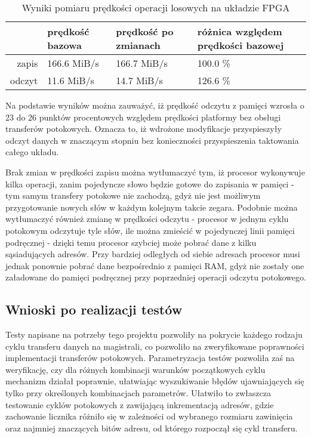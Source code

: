 \begin{table}[H]
\begin{center}
\begin{tabular}{ r|l|l|l| }
  & prędkość bazowa & prędkość po zmianach & różnica względem prędkości bazowej\\
 \hline
 zapis & 166.6 MiB/s & 166.7 MiB/s & 100.0 \%\\
 odczyt & 11.6 MiB/s & 14.7 MiB/s & 126.6 \%\\
 \hline
\end{tabular}
\end{center}
\caption{\label{tab:benchmark-rnd-arty}Wyniki pomiaru prędkości operacji losowych na układzie FPGA}
\end{table}

Na podstawie wyników można zauważyć, iż prędkość odczytu z pamięci wzrosła o 23 do 26 punktów procentowych względem prędkości platformy bez obsługi transferów potokowych. Oznacza to, iż wdrożone modyfikacje przyspieszyły odczyt danych w znaczącym stopniu bez konieczności przyspieszenia taktowania całego układu.

Brak zmian w prędkości zapisu można wytłumaczyć tym, iż procesor wykonywuje kilka operacji, zanim pojedyncze słowo będzie gotowe do zapisania w pamięci - tym samym transfery potokowe nie zachodzą, gdyż nie jest możliwym przygotowanie nowych słów w każdym kolejnym takcie zegara.
Podobnie można wytłumaczyć również zmianę w prędkości odczytu - procesor w jednym cyklu potokowym odczytuje tyle słów, ile można zmieścić w pojedynczej linii pamięci podręcznej - dzięki temu procesor szybciej może pobrać dane z kilku sąsiadujących adresów. Przy bardziej odległych od siebie adresach procesor musi jednak ponownie pobrać dane bezpośrednio z pamięci RAM, gdyż nie zostały one załadowane do pamięci podręcznej przy poprzedniej operacji odczytu potokowego.


\subsection{Wnioski po realizacji testów}

Testy napisane na potrzeby tego projektu pozwoliły na pokrycie każdego rodzaju cyklu transferu danych na magistrali, co pozwoliło na zweryfikowane poprawności implementacji transferów potokowych. Parametryzacja testów pozwoliła zaś na weryfikację, czy dla różnych kombinacji warunków początkowych cyklu mechanizm działał poprawnie, ułatwiając wyszukiwanie błędów ujawniających się tylko przy określonych kombinacjach parametrów. Ułatwiło to zwłaszcza testowanie cyklów potokowych z zawijającą inkrementacją adresów, gdzie zachowanie licznika różniło się w zależności od wybranego rozmiaru zawinięcia oraz najmniej znaczących bitów adresu, od którego rozpoczął się cykl transferu.

